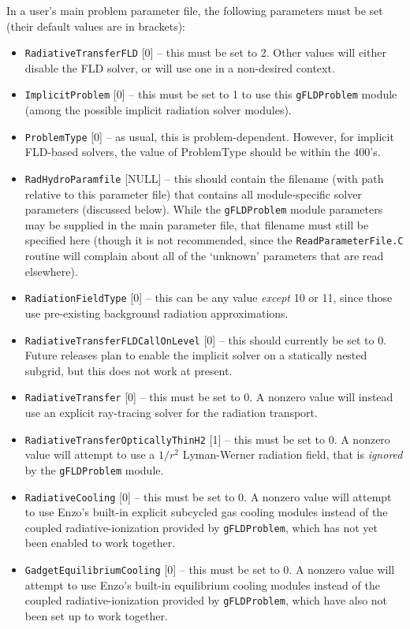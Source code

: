 \documentclass[letterpaper,10pt]{article}
\renewcommand{\(}{\left(}
\renewcommand{\)}{\right)}
\begin{document}
In a user's main problem parameter file, the following parameters
must be set (their default values are in brackets):
\begin{itemize}
\item {\tt RadiativeTransferFLD} [0] -- this must be set to 2.  Other
  values will either disable the FLD solver, or will use one in a
  non-desired context.
\item {\tt ImplicitProblem} [0] -- this must be set to 1 to use this
  {\tt gFLDProblem} module (among the possible implicit radiation solver
  modules).
\item {\tt ProblemType} [0] -- as usual, this is problem-dependent.
  However, for implicit FLD-based solvers, the value of ProblemType
  should be within the 400's.
\item {\tt RadHydroParamfile} [NULL] -- this should contain the filename
  (with path relative to this parameter file) that contains all
  module-specific solver parameters (discussed below).  While the 
  {\tt gFLDProblem} module parameters may be supplied in the main
  parameter file, that filename must still be specified here (though
  it is not recommended, since the {\tt ReadParameterFile.C} routine
  will complain about all of the `unknown' parameters that are read
  elsewhere).
\item {\tt RadiationFieldType} [0] -- this can be any value {\em except}
  10 or 11, since those use pre-existing background radiation
  approximations.
\item {\tt RadiativeTransferFLDCallOnLevel} [0] -- this should currently
  be set to 0.  Future releases plan to enable the implicit solver on
  a statically nested subgrid, but this does not work at present.
\item {\tt RadiativeTransfer} [0] -- this must be set to 0.  A nonzero
  value will instead use an explicit ray-tracing solver for the
  radiation transport. 
\item {\tt RadiativeTransferOpticallyThinH2} [1] -- this must be set
  to 0.  A nonzero value will attempt to use a $1/r^2$ Lyman-Werner
  radiation field, that is {\em ignored} by the {\tt gFLDProblem} module.
\item {\tt RadiativeCooling} [0] -- this must be set to 0.  A nonzero
  value will attempt to use Enzo's built-in explicit subcycled gas
  cooling modules instead of the coupled radiative-ionization provided
  by {\tt gFLDProblem}, which has not yet been enabled to work together. 
\item {\tt GadgetEquilibriumCooling} [0] -- this must be set to 0.  A
  nonzero value will attempt to use Enzo's built-in equilibrium cooling
  modules instead of the coupled radiative-ionization provided by 
  {\tt gFLDProblem}, which have also not been set up to work together. 
\end{itemize}
\end{document}
